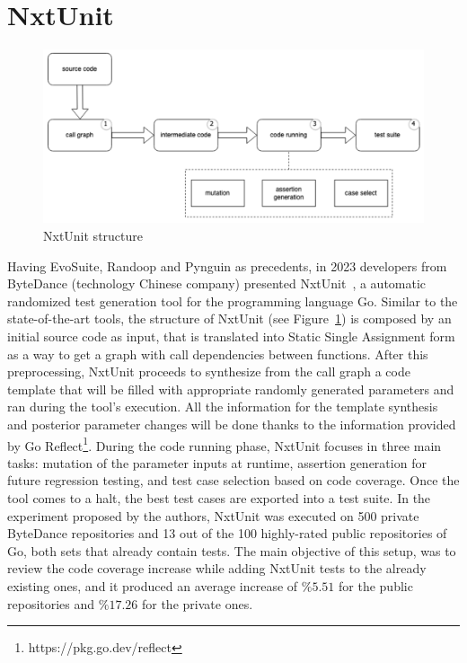 \documentclass[%
  chapterprefix=false,%
  open=right,%
  twoside=true,%
  paper=a4,%
  logofile={Figures/logo.png},%
  thesistype=master,%
  UKenglish,%
]{se2thesis}
\begin{document}
\section{NxtUnit}

\begin{figure}[bt]
  \centering
  \includegraphics[width=.99\textwidth]{Figures/nxtunit.png}
  \caption{NxtUnit structure}\label{fig:nxt}
\end{figure}

Having EvoSuite, Randoop and Pynguin as precedents, in 2023 developers from ByteDance (technology Chinese company) presented NxtUnit~\cite{DBLP:conf/ease/WangMCGSP23}, a automatic randomized test generation tool for the programming language Go.
Similar to the state-of-the-art tools, the structure of NxtUnit (see Figure~\ref{fig:nxt}) is composed by an initial source code as input, that is translated into Static Single Assignment form as a way to get a graph with call dependencies between functions.
After this preprocessing, NxtUnit proceeds to synthesize from the call graph a code template that will be filled with appropriate randomly generated parameters and ran during the tool's execution.
All the information for the template synthesis and posterior parameter changes will be done thanks to the information provided by Go Reflect\footnote{https://pkg.go.dev/reflect}.
During the code running phase, NxtUnit focuses in three main tasks: mutation of the parameter inputs at runtime, assertion generation for future regression testing, and test case selection based on code coverage.
Once the tool comes to a halt, the best test cases are exported into a test suite.
In the experiment proposed by the authors, NxtUnit was executed on 500 private ByteDance repositories and 13 out of the 100 highly-rated public repositories of Go, both sets that already contain tests.
The main objective of this setup, was to review the code coverage increase while adding NxtUnit tests to the already existing ones, and it produced an average increase of $\%5.51$ for the public repositories and $\%17.26$ for the private ones.
\end{document}
